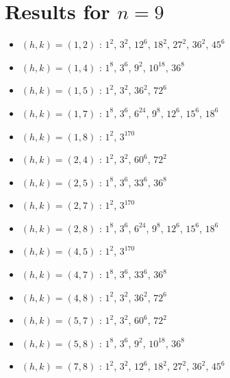 \section{Results for $n=9$}
\begin{itemize}
\item $(h,k)=(1,2)$ : $1^{2}$, $3^{2}$, $12^{6}$, $18^{2}$, $27^{2}$, $36^{2}$, $45^{6}$
\item $(h,k)=(1,4)$ : $1^{8}$, $3^{6}$, $9^{2}$, $10^{18}$, $36^{8}$
\item $(h,k)=(1,5)$ : $1^{2}$, $3^{2}$, $36^{2}$, $72^{6}$
\item $(h,k)=(1,7)$ : $1^{8}$, $3^{6}$, $6^{24}$, $9^{8}$, $12^{6}$, $15^{6}$, $18^{6}$
\item $(h,k)=(1,8)$ : $1^{2}$, $3^{170}$
\item $(h,k)=(2,4)$ : $1^{2}$, $3^{2}$, $60^{6}$, $72^{2}$
\item $(h,k)=(2,5)$ : $1^{8}$, $3^{6}$, $33^{6}$, $36^{8}$
\item $(h,k)=(2,7)$ : $1^{2}$, $3^{170}$
\item $(h,k)=(2,8)$ : $1^{8}$, $3^{6}$, $6^{24}$, $9^{8}$, $12^{6}$, $15^{6}$, $18^{6}$
\item $(h,k)=(4,5)$ : $1^{2}$, $3^{170}$
\item $(h,k)=(4,7)$ : $1^{8}$, $3^{6}$, $33^{6}$, $36^{8}$
\item $(h,k)=(4,8)$ : $1^{2}$, $3^{2}$, $36^{2}$, $72^{6}$
\item $(h,k)=(5,7)$ : $1^{2}$, $3^{2}$, $60^{6}$, $72^{2}$
\item $(h,k)=(5,8)$ : $1^{8}$, $3^{6}$, $9^{2}$, $10^{18}$, $36^{8}$
\item $(h,k)=(7,8)$ : $1^{2}$, $3^{2}$, $12^{6}$, $18^{2}$, $27^{2}$, $36^{2}$, $45^{6}$
\end{itemize}
